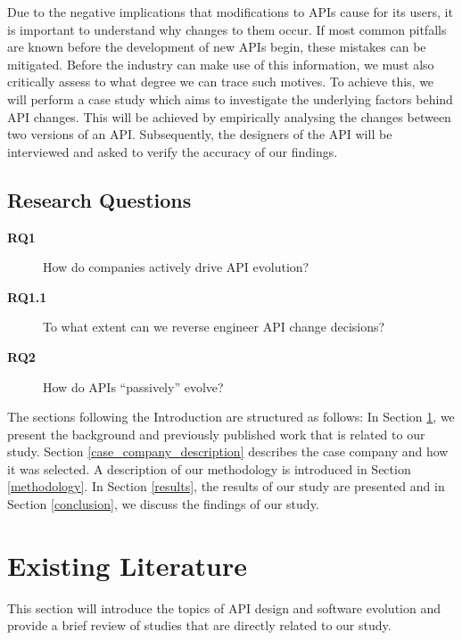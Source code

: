 \documentclass{sig-alternate}
\begin{document}
Due to the negative implications that modifications to APIs cause for its users, it is important to understand why changes to them occur. If most common pitfalls are known before the development of new APIs begin, these mistakes can be mitigated. Before the industry can make use of this information, we must also critically assess to what degree we can trace such motives. To achieve this, we will perform a case study which aims to investigate the underlying factors behind API changes. This will be achieved by empirically analysing the changes between two versions of an API. Subsequently, the designers of the API will be interviewed and asked to verify the accuracy of our findings. 

\subsection{Research Questions} \label{rqs}
\begin{description}
\item[\textbf{RQ1}] How do companies actively drive API evolution?
\item[\textbf{RQ1.1}] To what extent can we reverse engineer API change decisions?
\item[\textbf{RQ2}] How do APIs ``passively'' evolve?


\end{description}

The sections following the Introduction are structured as follows: In Section \ref{existing_literature}, we present the background and previously published work that is related to our study. Section \ref{case_company_description} describes the case company and how it was selected. A description of our methodology is introduced in Section \ref{methodology}. In Section \ref{results}, the results of our study are presented and in Section \ref{conclusion}, we discuss the findings of our study.

\section{Existing Literature} \label{existing_literature}
This section will introduce the topics of API design and software evolution and provide a brief review of studies that are directly related to our study. 
\end{document}
